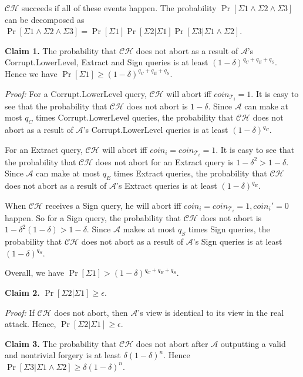 \documentclass[10pt,journal,compsoc]{IEEEtran}
\begin{document}
$\mathcal {CH}$ succeeds if all of these events happen. The
probability $\Pr[\Sigma1\wedge \Sigma2\wedge \Sigma3]$ can be
decomposed as $\Pr[\Sigma1\wedge \Sigma2\wedge \Sigma3]
= \Pr[\Sigma1]\Pr[\Sigma2|\Sigma1]\Pr[\Sigma3|\Sigma1
\wedge \Sigma2]$.

\medskip\noindent
\textbf{Claim 1.} The probability that $\mathcal {CH}$ does not abort
as a result of $\mathcal {A}$'s {\sf Corrupt.LowerLevel}, {\sf
Extract} and {\sf Sign} queries is at least
$(1-\delta)^{q_C+q_E+q_S}$. Hence we have $\Pr[\Sigma1] \geq
(1-\delta)^{q_C+q_E+q_S}$.

\emph{Proof:}
For a {\sf Corrupt.LowerLevel} query, $\mathcal {CH}$ will abort iff
$coin_{\mathcal{T}_i}=1$. It is easy to see that the probability
that $\mathcal {CH}$ does not abort is $1-\delta$. Since $\mathcal
{A}$ can make at most $q_C$ times {\sf Corrupt.LowerLevel} queries,
the probability that $\mathcal {CH}$ does not abort as a result of
$\mathcal {A}$'s {\sf Corrupt.LowerLevel} queries is at least
$(1-\delta)^{q_C}$.

For an {\sf Extract} query, $\mathcal {CH}$ will abort iff
$coin_i=coin_{\mathcal{T}_i}=1$. It is easy to see that the
probability that $\mathcal {CH}$ does not abort for an {\sf Extract}
query is $1-\delta^2> 1-\delta$. Since $\mathcal {A}$ can make at
most $q_E$ times {\sf Extract} queries, the probability that
$\mathcal {CH}$ does not abort as a result of $\mathcal {A}$'s {\sf
Extract} queries is at least $(1-\delta)^{q_E}$.

When $\mathcal {CH}$ receives a {\sf Sign} query, he will abort iff
$coin_i=coin_{\mathcal{T}_i}=1,coin_i'=0$ happen. So for a {\sf Sign} query, the
probability that $\mathcal {CH}$ does not abort is
$1-\delta^2(1-\delta)>1-\delta$. Since $\mathcal {A}$ makes at most
$q_S$ times {\sf Sign} queries, the probability that
 $\mathcal {CH}$ does not abort as a result of $\mathcal
{A}$'s {\sf Sign} queries is at least $(1-\delta)^{q_S}$.

Overall, we have $\Pr[\Sigma1] > (1-\delta)^{q_C+q_E+q_S}$.

\medskip
\noindent \textbf{Claim 2.} $\Pr[\Sigma2|\Sigma1]\geq \epsilon$.

\emph{Proof:}
If $\mathcal {CH}$ does not abort, then $\mathcal {A}$'s
view is identical to its view in the real attack. Hence,
$\Pr[\Sigma2|\Sigma1]\geq \epsilon$.


\medskip\noindent
\textbf{Claim 3.} The probability that $\mathcal {CH}$ does not abort
after $\mathcal {A}$ outputting a valid and nontrivial forgery is at
least $\delta(1-\delta)^n$. Hence $\Pr[\Sigma3|\Sigma1\wedge
\Sigma2]\geq \delta(1-\delta)^n$.
\end{document}
